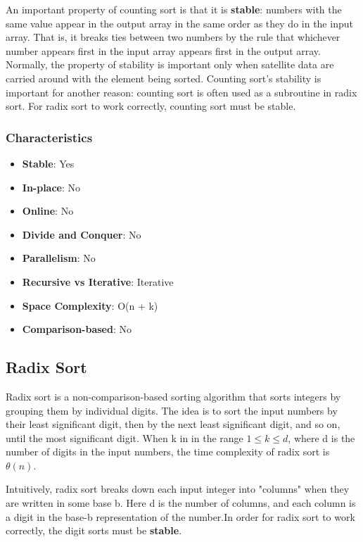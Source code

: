 An important property of counting sort is that it is \textbf{stable}: numbers with the same value appear in the output array in the same order as they do in the input array. That is, it breaks ties between two numbers by the rule that whichever number appears first in the input array appears first in the output array. Normally, the property of stability is important only when satellite data are carried around with the element being sorted. Counting sort’s stability is important for another reason: counting sort is often used as a subroutine in radix sort. For radix sort to work correctly, counting sort must be stable.

\subsubsection*{Characteristics}

\begin{multicols}{2}
    \begin{itemize}
        \item \textbf{Stable}: Yes
        \item \textbf{In-place}: No
        \item \textbf{Online}: No
        \item \textbf{Divide and Conquer}: No
        \item \textbf{Parallelism}: No
        \item \textbf{Recursive vs Iterative}: Iterative
        \item \textbf{Space Complexity}: O(n + k)
        \item \textbf{Comparison-based}: No
    \end{itemize}
\end{multicols}

\subsection{Radix Sort}

Radix sort is a non-comparison-based sorting algorithm that sorts integers by grouping them by individual digits. The idea is to sort the input numbers by their least significant digit, then by the next least significant digit, and so on, until the most significant digit. When k in in the range $1 \leq k \leq d$, where d is the number of digits in the input numbers, the time complexity of radix sort is $\theta(n)$.

Intuitively, radix sort breaks down each input integer into "columns" when they are written in some base b. Here d is the number of columns, and each column is a digit in the base-b representation of the number.In order for radix sort to work correctly, the digit sorts must be \textbf{stable}.

